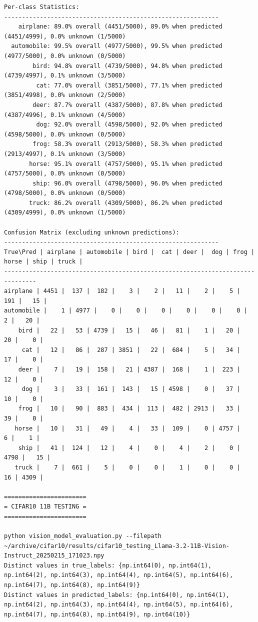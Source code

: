 \begin{verbatim}
Per-class Statistics:
------------------------------------------------------------
    airplane: 89.0% overall (4451/5000), 89.0% when predicted (4451/4999), 0.0% unknown (1/5000)
  automobile: 99.5% overall (4977/5000), 99.5% when predicted (4977/5000), 0.0% unknown (0/5000)
        bird: 94.8% overall (4739/5000), 94.8% when predicted (4739/4997), 0.1% unknown (3/5000)
         cat: 77.0% overall (3851/5000), 77.1% when predicted (3851/4998), 0.0% unknown (2/5000)
        deer: 87.7% overall (4387/5000), 87.8% when predicted (4387/4996), 0.1% unknown (4/5000)
         dog: 92.0% overall (4598/5000), 92.0% when predicted (4598/5000), 0.0% unknown (0/5000)
        frog: 58.3% overall (2913/5000), 58.3% when predicted (2913/4997), 0.1% unknown (3/5000)
       horse: 95.1% overall (4757/5000), 95.1% when predicted (4757/5000), 0.0% unknown (0/5000)
        ship: 96.0% overall (4798/5000), 96.0% when predicted (4798/5000), 0.0% unknown (0/5000)
       truck: 86.2% overall (4309/5000), 86.2% when predicted (4309/4999), 0.0% unknown (1/5000)

Confusion Matrix (excluding unknown predictions):
------------------------------------------------------------
True\Pred | airplane | automobile | bird |  cat | deer |  dog | frog | horse | ship | truck |
-------------------------------------------------------------------------------
airplane | 4451 |  137 |  182 |    3 |    2 |   11 |    2 |    5 |  191 |   15 |
automobile |    1 | 4977 |    0 |    0 |    0 |    0 |    0 |    0 |    2 |   20 |
    bird |   22 |   53 | 4739 |   15 |   46 |   81 |    1 |   20 |   20 |    0 |
     cat |   12 |   86 |  287 | 3851 |   22 |  684 |    5 |   34 |   17 |    0 |
    deer |    7 |   19 |  158 |   21 | 4387 |  168 |    1 |  223 |   12 |    0 |
     dog |    3 |   33 |  161 |  143 |   15 | 4598 |    0 |   37 |   10 |    0 |
    frog |   10 |   90 |  883 |  434 |  113 |  482 | 2913 |   33 |   39 |    0 |
   horse |   10 |   31 |   49 |    4 |   33 |  109 |    0 | 4757 |    6 |    1 |
    ship |   41 |  124 |   12 |    4 |    0 |    4 |    2 |    0 | 4798 |   15 |
   truck |    7 |  661 |    5 |    0 |    0 |    1 |    0 |    0 |   16 | 4309 |

=======================
= CIFAR10 11B TESTING =
=======================

python vision_model_evaluation.py --filepath ~/archive/cifar10/results/cifar10_testing_Llama-3.2-11B-Vision-Instruct_20250215_171023.npy
Distinct values in true_labels: {np.int64(0), np.int64(1), np.int64(2), np.int64(3), np.int64(4), np.int64(5), np.int64(6), np.int64(7), np.int64(8), np.int64(9)}
Distinct values in predicted_labels: {np.int64(0), np.int64(1), np.int64(2), np.int64(3), np.int64(4), np.int64(5), np.int64(6), np.int64(7), np.int64(8), np.int64(9), np.int64(10)}


\end{verbatim}
